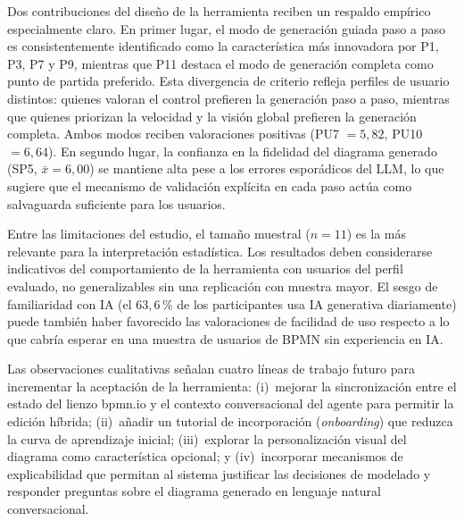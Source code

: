 Dos contribuciones del diseño de la herramienta reciben un respaldo empírico especialmente claro. En primer lugar, el modo de generación guiada paso a paso es consistentemente identificado como la característica más innovadora por P1, P3, P7 y P9, mientras que P11 destaca el modo de generación completa como punto de partida preferido. Esta divergencia de criterio refleja perfiles de usuario distintos: quienes valoran el control prefieren la generación paso a paso, mientras que quienes priorizan la velocidad y la visión global prefieren la generación completa. Ambos modos reciben valoraciones positivas (PU7 $= 5{,}82$, PU10 $= 6{,}64$). En segundo lugar, la confianza en la fidelidad del diagrama generado (SP5, $\bar{x} = 6{,}00$) se mantiene alta pese a los errores esporádicos del LLM, lo que sugiere que el mecanismo de validación explícita en cada paso actúa como salvaguarda suficiente para los usuarios.

Entre las limitaciones del estudio, el tamaño muestral ($n = 11$) es la más relevante para la interpretación estadística. Los resultados deben considerarse indicativos del comportamiento de la herramienta con usuarios del perfil evaluado, no generalizables sin una replicación con muestra mayor. El sesgo de familiaridad con IA (el $63,6$\,\% de los participantes usa IA generativa diariamente) puede también haber favorecido las valoraciones de facilidad de uso respecto a lo que cabría esperar en una muestra de usuarios de BPMN sin experiencia en IA.

Las observaciones cualitativas señalan cuatro líneas de trabajo futuro para incrementar la aceptación de la herramienta: (i)~mejorar la sincronización entre el estado del lienzo bpmn.io y el contexto conversacional del agente para permitir la edición híbrida; (ii)~añadir un tutorial de incorporación (\textit{onboarding}) que reduzca la curva de aprendizaje inicial; (iii)~explorar la personalización visual del diagrama como característica opcional; y (iv)~incorporar mecanismos de explicabilidad que permitan al sistema justificar las decisiones de modelado y responder preguntas sobre el diagrama generado en lenguaje natural conversacional.

